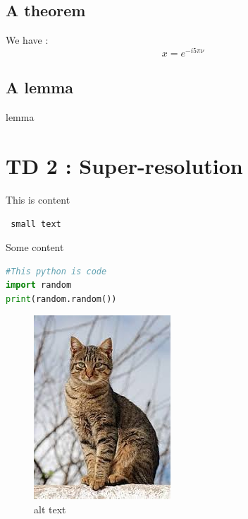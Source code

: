 \documentclass[a4paper,12pt,french]{article}
\newcommand{\passthrough}[1]{#1}
\begin{document}
\hypertarget{a-theorem}{%
\subsection{A theorem}\label{a-theorem}}

We have : \[x = e^{- i 5\pi \nu}\]

\hypertarget{a-lemma}{%
\subsection{A lemma}\label{a-lemma}}

lemma

\hypertarget{td-2-super-resolution}{%
\section{TD 2 : Super-resolution}\label{td-2-super-resolution}}

This is content

\passthrough{\lstinline! small text !}

Some content

\begin{lstlisting}[language=Python]
#This python is code
import random
print(random.random())
\end{lstlisting}

\begin{figure}
\centering
\includegraphics{image.png}
\caption{alt text}
\end{figure}


\end{document}
